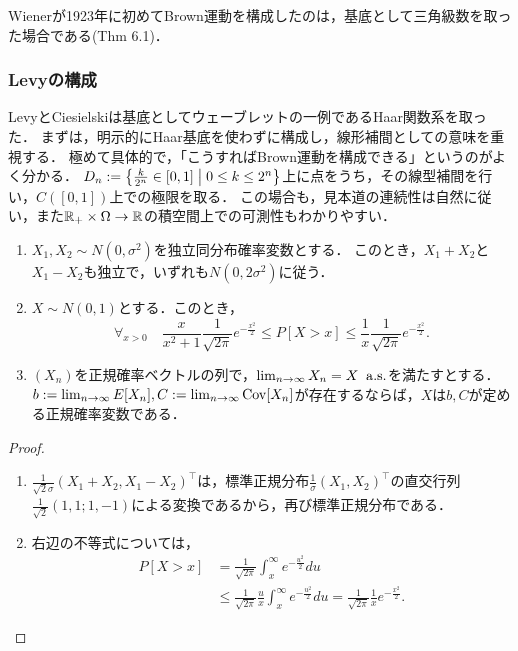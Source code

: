 \documentclass[uplatex,dvipdfmx]{jsreport}
\begin{document}
\begin{tcolorbox}[colframe=ForestGreen, colback=ForestGreen!10!white,breakable,colbacktitle=ForestGreen!40!white,coltitle=black,fonttitle=\bfseries\sffamily,
title=]
    Wienerが1923年に初めてBrown運動を構成したのは，基底として三角級数を取った場合である\cite{Bass}(Thm 6.1)．
\end{tcolorbox}

\subsubsection{Levyの構成}

\begin{tcolorbox}[colframe=ForestGreen, colback=ForestGreen!10!white,breakable,colbacktitle=ForestGreen!40!white,coltitle=black,fonttitle=\bfseries\sffamily,
title=]
    LevyとCiesielskiは基底としてウェーブレットの一例であるHaar関数系を取った．
    まずは，明示的にHaar基底を使わずに構成し，線形補間としての意味を重視する．
    極めて具体的で，「こうすればBrown運動を構成できる」というのがよく分かる．
    $D_n:=\left\{\frac{k}{2^n}\in[0,1]\;\middle|\;0\le k\le 2^n\right\}$上に点をうち，その線型補間を行い，$C([0,1])$上での極限を取る．
    この場合も，見本道の連続性は自然に従い，また$\mathbb{R}_+\times\Omega\to\mathbb{R}$の積空間上での可測性もわかりやすい．
\end{tcolorbox}

\begin{lemma}\mbox{}
    \begin{enumerate}
        \item $X_1,X_2\sim N(0,\sigma^2)$を独立同分布確率変数とする．
        このとき，$X_1+X_2$と$X_1-X_2$も独立で，いずれも$N(0,2\sigma^2)$に従う．
        \item $X\sim N(0,1)$とする．このとき，
        \[\forall_{x>0}\quad\frac{x}{x^2+1}\frac{1}{\sqrt{2\pi}}e^{-\frac{x^2}{2}}\le P[X>x]\le\frac{1}{x}\frac{1}{\sqrt{2\pi}}e^{-\frac{x^2}{2}}.\]
        \item $(X_n)$を正規確率ベクトルの列で，$\lim_{n\to\infty}X_n=X\;\;\mathrm{a.s.}$を満たすとする．$b:=\lim_{n\to\infty}E[X_n],C:=\lim_{n\to\infty}\mathrm{Cov}[X_n]$が存在するならば，$X$は$b,C$が定める正規確率変数である．
    \end{enumerate}
\end{lemma}
\begin{proof}\mbox{}
    \begin{enumerate}
        \item $\frac{1}{\sqrt{2}\sigma}(X_1+X_2,X_1-X_2)^\top$は，標準正規分布$\frac{1}{\sigma}(X_1,X_2)^\top$の直交行列$\frac{1}{\sqrt{2}}(1,1;1,-1)$による変換であるから，再び標準正規分布である．
        \item 右辺の不等式については，
        \begin{align*}
            P[X>x]&=\frac{1}{\sqrt{2\pi}}\int^\infty_xe^{-\frac{u^2}{2}}du\\
            &\le\frac{1}{\sqrt{2\pi}}\frac{u}{x}\int^\infty_xe^{-\frac{u^2}{2}}du
            =\frac{1}{\sqrt{2\pi}}\frac{1}{x}e^{-\frac{x^2}{2}}.
        \end{align*}
    \end{enumerate}
\end{proof}
\end{document}
